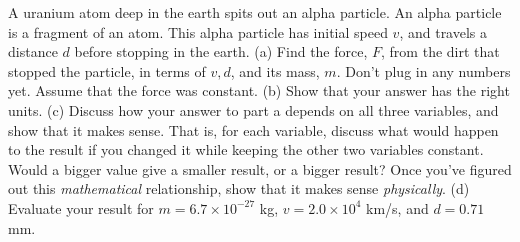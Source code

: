 A uranium atom deep in the earth spits out an alpha
particle. An alpha particle is a fragment of an atom. This
alpha particle has initial speed $v$, and travels a distance
$d$ before stopping in the earth.\hwendpart
 (a) Find the force, $F$, from the dirt
that stopped the particle, in terms of $v,d$, and its mass,
$m$. Don't plug in any numbers yet. Assume that the force
was constant.\answercheck\hwendpart
 (b) Show that your answer has the right units.\hwendpart
(c) Discuss how your answer to part a depends on all three
variables, and show that it makes sense. That is, for each
variable, discuss what would happen to the result if you
changed it while keeping the other two variables constant.
Would a bigger value give a smaller result, or a bigger
result? Once you've figured out this \emph{mathematical}
relationship, show that it makes sense \emph{physically}.\hwendpart
(d) Evaluate your result for $m=6.7\times10^{-27}$  kg,
$v=2.0\times10^4$  km/s, and $d=0.71$ mm.\answercheck\hwendpart
